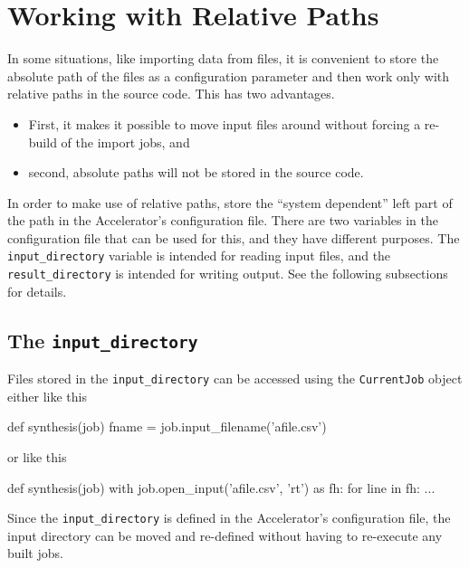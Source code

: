 \section{Working with Relative Paths}
In some situations, like importing data from files, it is convenient
to store the absolute path of the files as a configuration parameter
and then work only with relative paths in the source code.  This has
two advantages.
\begin{itemize}
\item[] First, it makes it possible to move input files around without
forcing a re-build of the import jobs, and
\item[] second, absolute paths will not be stored in the source code.
\end{itemize}
In order to make use of relative paths, store the ``system dependent''
left part of the path in the Accelerator's configuration file.  There
are two variables in the configuration file that can be used for this,
and they have different purposes.  The \texttt{input\_directory}
variable is intended for reading input files, and
the \texttt{result\_directory} is intended for writing output.  See
the following subsections for details.


\subsection{The \texttt{input\_directory}}
\label{sec:INPUT_DIR}
Files stored in the \texttt{input\_directory} can be accessed using
the \texttt{CurrentJob} object either like this
\begin{python}
def synthesis(job)
    fname = job.input_filename('afile.csv')
\end{python}
or like this
\begin{python}
def synthesis(job)
    with job.open_input('afile.csv', 'rt') as fh:
        for line in fh:
            ...
\end{python}
Since the \texttt{input\_directory} is defined in the Accelerator's
configuration file, the input directory can be moved and re-defined
without having to re-execute any built jobs.



